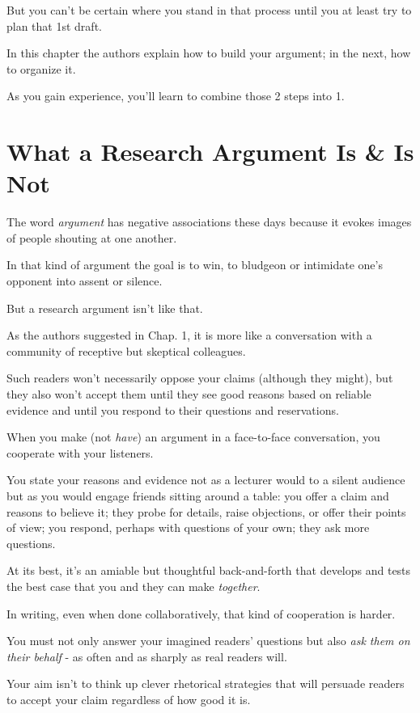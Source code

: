 \documentclass[oneside]{book}
\numberwithin{equation}{section}
\begin{document}
But you can't be certain where you stand in that process until you at least try to plan that 1st draft.

%
In this chapter the authors explain how to build your argument; in the next, how to organize it.

As you gain experience, you'll learn to combine those 2 steps into 1.

\section{What a Research Argument Is \& Is Not}
The word \textit{argument} has negative associations these days because it evokes images of people shouting at one another.

In that kind of argument the goal is to win, to bludgeon or intimidate one's opponent into assent or silence.

But a research argument isn't like that.

As the authors suggested in Chap. 1, it is more like a conversation with a community of receptive but skeptical colleagues.

Such readers won't necessarily oppose your claims (although they might), but they also won't accept them until they see good reasons based on reliable evidence and until you respond to their questions and reservations.

%
When you make (not \textit{have}) an argument in a face-to-face conversation, you cooperate with your listeners.

You state your reasons and evidence not as a lecturer would to a silent audience but as you would engage friends sitting around a table: you offer a claim and reasons to believe it; they probe for details, raise objections, or offer their points of view; you respond, perhaps with questions of your own; they ask more questions.

At its best, it's an amiable but thoughtful back-and-forth that develops and tests the best case that you and they can make \textit{together}.

%
In writing, even when done collaboratively, that kind of cooperation is harder.

You must not only answer your imagined readers' questions but also \textit{ask them on their behalf} - as often and as sharply as real readers will.

Your aim isn't to think up clever rhetorical strategies that will persuade readers to accept your claim regardless of how good it is.
\end{document}
